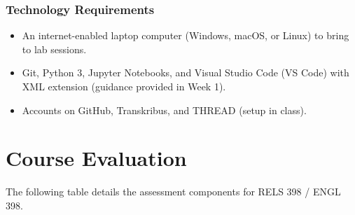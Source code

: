 \documentclass[12pt,oncampus]{article}
\begin{document}
\subsubsection*{Technology Requirements}
\begin{itemize}
  \item An internet-enabled laptop computer (Windows, macOS, or Linux) to bring to lab sessions.
  \item Git, Python 3, Jupyter Notebooks, and Visual Studio Code (VS Code) with XML extension (guidance provided in Week 1).
  \item Accounts on GitHub, Transkribus, and THREAD (setup in class).
\end{itemize}

\section*{Course Evaluation}

The following table details the assessment components for RELS 398 / ENGL 398.
\end{document}
